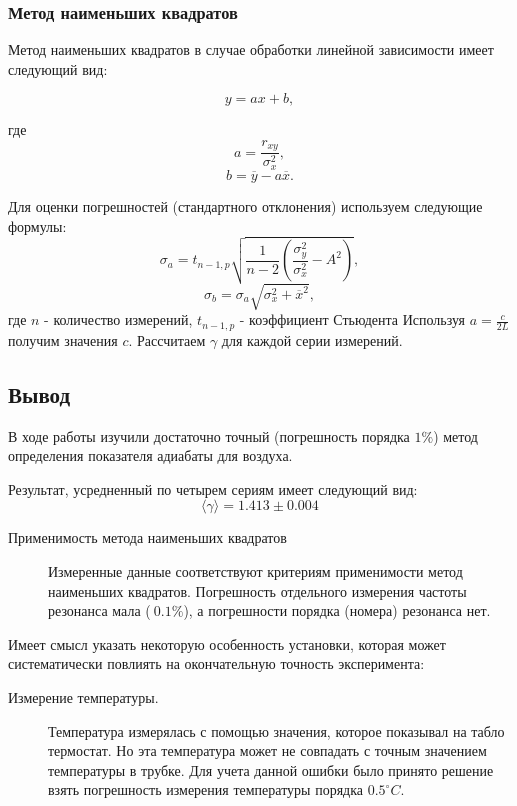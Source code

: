 \documentclass[12pt,a4paper]{article}
\begin{document}
\subsubsection*{Метод наименьших квадратов}
Метод наименьших квадратов в случае обработки линейной зависимости имеет следующий вид:

$$y = ax + b,$$

где $$a = \frac{r_{xy}}{ \sigma_x^2},$$
$$b = \overline{y} - a\overline{x}.$$

Для оценки погрешностей (стандартного отклонения) используем следующие формулы:
$$\sigma_a =  t_{n-1, p} \sqrt{\frac{1}{n-2} \left( \frac{\sigma_y^2}{\sigma_x^2} - A^2 \right)},$$
$$\sigma_b = \sigma_a \sqrt{\sigma_x^2 + \overline{x}^2},$$
где 
$n$ - количество измерений, $ t_{n-1, p}$ - коэффициент Стьюдента
Используя $a = \frac{c}{2L}$ получим значения $c$.
Рассчитаем $\gamma$ для каждой серии измерений.


\subsection*{Вывод}

В ходе работы изучили достаточно точный (погрешность порядка $1\%$) метод определения показателя адиабаты для воздуха. 

Результат, усредненный по четырем сериям имеет следующий вид:
$$	\langle\gamma\rangle = 1.413 \pm 0.004$$

\begin{description}
	\item[Применимость метода наименьших квадратов]
	Измеренные данные соответствуют критериям применимости метод наименьших квадратов. Погрешность отдельного измерения частоты резонанса мала ($~0.1\%$), а погрешности порядка (номера) резонанса нет. 
\end{description}

Имеет смысл указать некоторую особенность установки, которая может систематически повлиять на окончательную точность эксперимента:

\begin{description}
	\item[Измерение температуры.]
		Температура измерялась с помощью значения, которое показывал на табло термостат. Но эта температура может не совпадать с точным значением температуры в трубке. Для учета данной ошибки было принято решение взять погрешность измерения температуры порядка $0.5^\circ C$.
\end{description}
\end{document}
